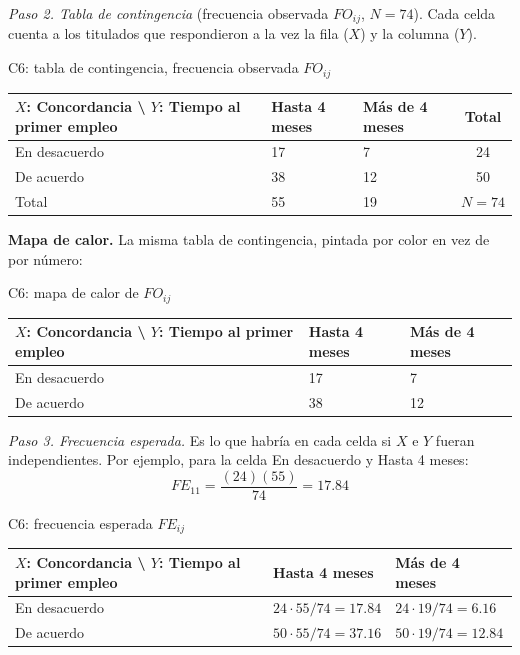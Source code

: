 \textit{Paso 2. Tabla de contingencia} (frecuencia observada $FO_{ij}$, $N = 74$). Cada celda cuenta a los titulados que respondieron a la vez la fila ($X$) y la columna ($Y$).

\begin{mitabla}{C6: tabla de contingencia, frecuencia observada $FO_{ij}$}
\begin{tabular}{L{3.8cm}C{3.00cm}C{3.00cm}|c}
\toprule
$X$: Concordancia \textbackslash{} $Y$: Tiempo al primer empleo & Hasta 4 meses & Más de 4 meses & Total \\
\midrule
En desacuerdo & 17 & 7 & 24 \\
De acuerdo & 38 & 12 & 50 \\
\midrule
Total & 55 & 19 & $N = 74$ \\
\bottomrule
\end{tabular}
\end{mitabla}

\textbf{Mapa de calor.} La misma tabla de contingencia, pintada por color en vez de por número:

\begin{mitabla}{C6: mapa de calor de $FO_{ij}$}
\begin{tabular}{L{3.8cm}C{3.00cm}C{3.00cm}}
\toprule
$X$: Concordancia \textbackslash{} $Y$: Tiempo al primer empleo & Hasta 4 meses & Más de 4 meses \\
\midrule
En desacuerdo & 17 & 7 \\
De acuerdo & 38 & 12 \\
\bottomrule
\end{tabular}
\end{mitabla}

\textit{Paso 3. Frecuencia esperada.} Es lo que habría en cada celda si $X$ e $Y$ fueran independientes. Por ejemplo, para la celda En desacuerdo y Hasta 4 meses:
\[
FE_{11} = \frac{(24)(55)}{74} = 17.84
\]

\begin{mitabla}{C6: frecuencia esperada $FE_{ij}$}
\begin{tabular}{L{3.8cm}C{3.00cm}C{3.00cm}}
\toprule
$X$: Concordancia \textbackslash{} $Y$: Tiempo al primer empleo & Hasta 4 meses & Más de 4 meses \\
\midrule
En desacuerdo & $24\cdot55/74 = 17.84$ & $24\cdot19/74 = 6.16$ \\
De acuerdo & $50\cdot55/74 = 37.16$ & $50\cdot19/74 = 12.84$ \\
\bottomrule
\end{tabular}
\end{mitabla}

